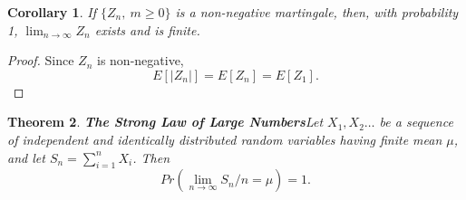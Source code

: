 \documentclass[a4paper,10pt]{article}
\theoremstyle{plain}
\newtheorem{thm}{Theorem}[section]
\newtheorem{cor}[thm]{Corollary}
\theoremstyle{definition}
\theoremstyle{remark}
\begin{document}
\begin{cor}
If $\{Z_n,~m \geq 0\}$ is a non-negative martingale, then, with probability 1, $\lim_{n \rightarrow \infty}Z_n$ exists and is finite.
\end{cor}
\begin{proof}
Since $Z_n$ is non-negative,
\begin{equation*}
E[|Z_n|]=E[Z_n]=E[Z_1].
\end{equation*}
\end{proof}
\begin{thm}
\textbf{The Strong Law of Large Numbers}Let $X_1,X_2 \hdots $ be  a sequence of independent and identically distributed random variables having finite mean $\mu$, and let $S_n=\sum_{i=1}^{n}X_i$. Then
\begin{equation*}
Pr(\lim_{n \rightarrow \infty}S_n/n= \mu) = 1.
\end{equation*}
\end{thm}
\end{document}

